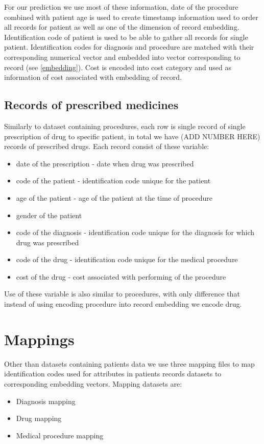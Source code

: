 For our prediction we use most of these information, date of the procedure combined with patient age is used to create timestamp information used to order all records for patient as well as one of the dimension of record embedding. Identification code of patient is used to be able to gather all records for single patient. Identification codes for diagnosis and procedure are matched with their corresponding numerical vector and embedded into vector corresponding to record (see \ref{embedding}). Cost is encoded into cost category and used as information of cost associated with embedding of record.

\subsection{Records of prescribed medicines}

Similarly to dataset containing procedures, each row is single record of single prescription of drug to specific patient, in total we have (ADD NUMBER HERE) records of prescribed drugs. Each record consist of these variable:
\begin{itemize}
	\item date of the prescription - date when drug was prescribed
	\item code of the patient - identification code unique for the patient
	\item age of the patient - age of the patient at the time of procedure
	\item gender of the patient
	\item code of the diagnosis - identification code unique for the diagnosis for which drug was prescribed
	\item code of the drug - identification code unique for the medical procedure 
	\item cost of the drug - cost associated with performing of the procedure
\end{itemize}

Use of these variable is also similar to procedures, with only difference that instead of using encoding procedure into record embedding we encode drug.

\section{Mappings}

Other than datasets containing patients data we use three mapping files to map identification codes used for attributes in patients records datasets to corresponding embedding vectors. Mapping datasets are:
\begin{itemize}
	\item Diagnosis mapping
	\item Drug mapping
	\item Medical procedure mapping
\end{itemize}



